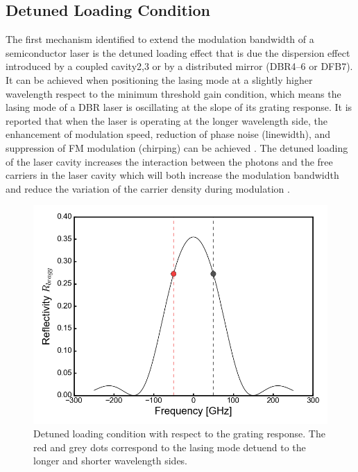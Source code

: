 \subsection{Detuned Loading Condition}\label{subsec:detuned_loading}
The first mechanism identified to extend the modulation bandwidth of a semiconductor laser is the detuned loading effect that is due the dispersion effect introduced by a coupled cavity2,3 or by a distributed mirror (DBR4–6 or DFB7). It can be achieved when positioning the lasing mode at a slightly higher wavelength respect to the minimum threshold gain condition, which means the lasing mode of a DBR laser is oscillating at the slope of its grating response. It is reported that when the laser is operating at the longer wavelength side, the enhancement of modulation speed, reduction of phase noise (linewidth), and suppression of FM modulation (chirping) can be achieved \cite{vahala1984detuned}.
The detuned loading of the laser cavity increases the interaction between the photons and the free carriers in the laser cavity \cite{vahala1984detuned} which will both increase the modulation bandwidth and reduce the variation of the carrier density during modulation \cite{kjebon2002experimental}. 

\begin{figure}[ht]
    \centering
    \includegraphics[width=.65\linewidth]{figures/detuned_loading_principle.png}
    \caption{Detuned loading condition with respect to the grating response. The red and grey dots correspond to the lasing mode detuend to the longer and shorter wavelength sides.}
    \label{fig:detuned_loading_principle}
\end{figure}



